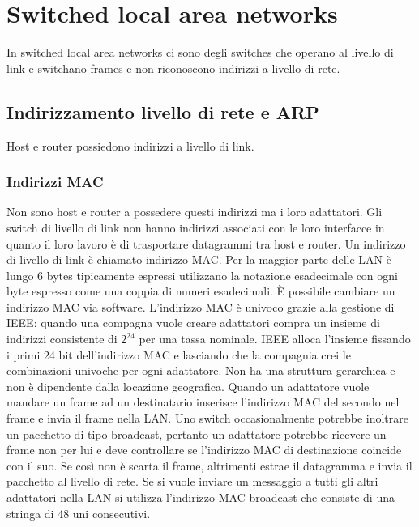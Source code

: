 \section{Switched local area networks}
In switched local area networks ci sono degli switches che operano al livello di link e switchano frames e non riconoscono indirizzi a livello di rete. 
\subsection{Indirizzamento livello di rete e ARP}
Host e router possiedono indirizzi a livello di link. 
\subsubsection{Indirizzi MAC}
Non sono host e router a possedere questi indirizzi ma i loro adattatori. Gli switch di livello di link non hanno indirizzi associati con le loro interfacce in quanto il loro lavoro \`e di trasportare datagrammi tra 
host e router. Un indirizzo di livello di link \`e chiamato indirizzo MAC. Per la maggior parte delle LAN \`e lungo 6 bytes tipicamente  espressi utilizzano la notazione esadecimale con ogni byte espresso come una 
coppia di numeri esadecimali. \`E possibile cambiare un indirizzo MAC via software. L'indirizzo MAC \`e univoco grazie alla gestione di IEEE: quando una compagna vuole creare adattatori compra un insieme di
indirizzi consistente di $2^{24}$ per una tassa nominale. IEEE alloca l'insieme fissando i primi 24 bit dell'indirizzo MAC e lasciando che la compagnia crei le combinazioni univoche per ogni adattatore. Non ha
una struttura gerarchica e non \`e dipendente dalla locazione geografica. Quando un adattatore vuole mandare un frame ad un destinatario inserisce l'indirizzo MAC del secondo nel frame e invia il frame nella 
LAN. Uno switch occasionalmente potrebbe inoltrare un pacchetto di tipo broadcast, pertanto un adattatore potrebbe ricevere un frame non per lui e deve controllare se l'indirizzo MAC di destinazione coincide con il suo. Se cos\`i non \`e scarta il frame, altrimenti estrae il datagramma e invia il pacchetto al livello di rete. Se si vuole inviare un messaggio a tutti gli altri adattatori nella LAN si utilizza l'indirizzo MAC broadcast  che consiste di una stringa di 48 uni consecutivi. 
